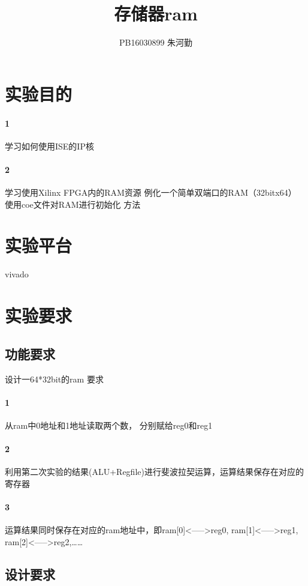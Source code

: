 \documentclass[UTF8]{ctexart}
\title{存储器ram}
\author{PB16030899 朱河勤}
\begin{document}
\maketitle
\tableofcontents

\section{实验目的}

\paragraph{1}学习如何使用ISE的IP核
\paragraph{2}学习使用Xilinx FPGA内的RAM资源
例化一个简单双端口的RAM（32bitx64）
使用coe文件对RAM进行初始化
方法


\section{实验平台}
vivado



\section{实验要求}

\subsection{功能要求}
设计一64*32bit的ram 要求
\paragraph{1}从ram中0地址和1地址读取两个数， 分别赋给reg0和reg1
\paragraph{2}利用第二次实验的结果(ALU+Regfile)进行斐波拉契运算，运算结果保存在对应的寄存器
\paragraph{3}运算结果同时保存在对应的ram地址中，即ram[0]<----->reg0, ram[1]<----->reg1,
   ram[2]<----->reg2,……

\subsection{设计要求}
\end{document}
